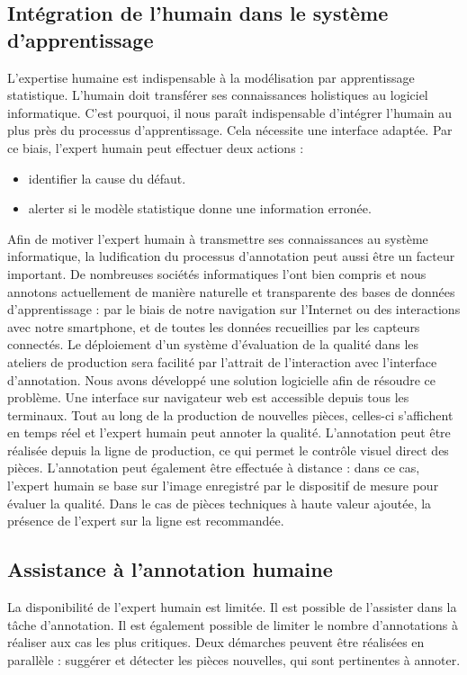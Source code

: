 \subsection{Intégration de l'humain dans le système d'apprentissage}
L'expertise humaine est indispensable à la modélisation par apprentissage statistique.
L'humain doit transférer ses connaissances holistiques au logiciel informatique.
C'est pourquoi, il nous paraît indispensable d'intégrer l'humain au plus près du processus d'apprentissage.
Cela nécessite une interface adaptée.
Par ce biais, l'expert humain peut effectuer deux actions :
\begin{itemize}
    \item identifier la cause du défaut.
    \item alerter si le modèle statistique donne une information erronée.
\end{itemize}
Afin de motiver l'expert humain à transmettre ses connaissances au système informatique, la ludification du processus d'annotation peut aussi être un facteur important.
De nombreuses sociétés informatiques l'ont bien compris et nous annotons actuellement de manière naturelle et transparente des bases de données d'apprentissage : par le biais de notre navigation sur l'Internet ou des interactions avec notre smartphone, et de toutes les données recueillies par les capteurs connectés.
Le déploiement d'un système d'évaluation de la qualité dans les ateliers de production sera facilité par l'attrait de l'interaction avec l'interface d'annotation.
Nous avons développé une solution logicielle afin de résoudre ce problème. Une interface sur navigateur web est accessible depuis tous les terminaux.
Tout au long de la production de nouvelles pièces, celles-ci s'affichent en temps réel et l'expert humain peut annoter la qualité.
L'annotation peut être réalisée depuis la ligne de production, ce qui permet le contrôle visuel direct des pièces.
L'annotation peut également être effectuée à distance : dans ce cas, l'expert humain se base sur l'image enregistré par le dispositif de mesure pour évaluer la qualité.
Dans le cas de pièces techniques à haute valeur ajoutée, la présence de l'expert sur la ligne est recommandée.

\subsection{Assistance à l'annotation humaine}
La disponibilité de l'expert humain est limitée.
Il est possible de l'assister dans la tâche d'annotation.
Il est également possible de limiter le nombre d'annotations à réaliser aux cas les plus critiques.
Deux démarches peuvent être réalisées en parallèle : suggérer et détecter les pièces nouvelles, qui sont pertinentes à annoter.

